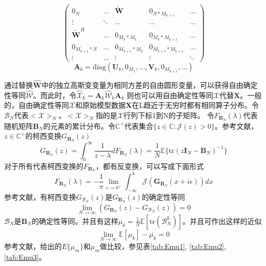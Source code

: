 \documentclass[bachelor,nocolorlinks, printoneside]{seuthesis} %
\begin{document}
\begin{Main}
\begin{equation}
\left(
\begin{array}{ccccc}
0_N & \ldots & \tilde{\mathbf{W}} & 0_{N*M_{k+1}} & \ldots \\
\vdots & \ddots & \ldots & \ldots & \ldots \\
\tilde{\mathbf{W}}^H & \ldots & 0_{M_k * M_k} & 0_{M_k*M_{k+1}} & \ldots \\
0_{M_{k+1}*N} & \ldots & 0_{M_{k+1} *M_k} & 0_{M_{k+1}*M_{k+1}} & \ldots \\
\vdots & \ldots & \vdots & \vdots & \ddots
\end{array}
\right)
\end{equation}
\begin{equation}\label{key}
\mathbf{A}_k = \mathrm{diag}(\mathbf{U}_k,0_{M_1},\ldots,\mathbf{V}_k,0_{M_{k+1}},\ldots)
\end{equation}

通过替换$\hat{\mathbf{W}}$中的独立高斯变变量为相同方差的自由圆形变量，可以获得自由确定性等同$\hat{\mathcal{W}}$。而此时，令$\hat{\mathcal{X}}_k = \mathbf{A}_k \hat{\mathcal{W}}_k \mathbf{A}_k$ 则也可以用自由确定性等同$\mathcal{X}$代替$\mathbf{X}$。一般的，自由确定性等同$\mathcal{X}$和原始模型数据$\mathbf{X}$在L趋近于无穷时都有相同算子分布。令$\mathcal{B}_N$代表$<\mathcal{X}>_N$。$<\mathcal{X}>_N$指的是$\mathcal{X}$行列下标1到N的子矩阵。
令$F_{\mathbf{B}_N}(\lambda)$代表随机矩阵$\mathbf{B}_N$的元素的累计分布。令$\mathbb{C}^+$代表集合$\lbrace z\in \mathbb{C}: \mathcal{J}(z) > 0 \rbrace$。参考文献，$z \in \mathbb{C}^+$的柯西变换$G_{\mathbf{B}_N}(z)$
\begin{equation}\label{key}
G_{\mathbf{B}_N}(z) = \int_0^\infty \frac{1}{z-\lambda} dF_{\mathbf{B}_N}(\lambda) = \frac{1}{N} \mathbb{E}\lbrace \mathrm{tr}(z \mathbf{I}_N - \mathbf{B}_N)^{-1}\rbrace
\end{equation}
对于所有代表柯西变换的$F_{\mathbf{B}_N}$，都有反变换，可以写成下面形式
\begin{equation}\label{key}
F_{\mathbf{B}_N}(\lambda) = -\frac{1}{\pi} \lim_{\epsilon \rightarrow 0^+} \int_{-\infty}^{\lambda}  \mathcal{J}(\mathbf{G}_{\mathbf{B}_N}(x+i\epsilon))dx
\end{equation}
参考文献，有柯西变换$G_{\mathcal{B}_N}(z)$是$G_{\mathbf{B}_N}(z)$的确定性等同
\begin{equation}\label{key}
\lim_{N \rightarrow \infty}(G_{\mathbf{B}_N}(z)-G_{\mathcal{B}_N}(z)) = 0
\end{equation}
$\mathcal{B}_N$是$\mathbf{B}_N$的确定性等同。并且有这样$\overline{\mu}_k = \frac{1}{N}\mathbb{E}[\mathrm{tr}(\mathcal{B}_N^k)]$。并且可作出这样的近似
\begin{equation}\label{key}
\lim_{N \rightarrow \infty} \mathbb{E}[\mu_k] -\overline{\mu_k} =0
\end{equation}
参考文献\cite{lu2015low}，给出的$E\lbrace\mu_m\rbrace$和$\mu_m$做比较，参见表\ref{tab:Emu1}, \ref{tab:Emu2}, \ref{tab:Emu3}。


\end{Main}
\end{document}
